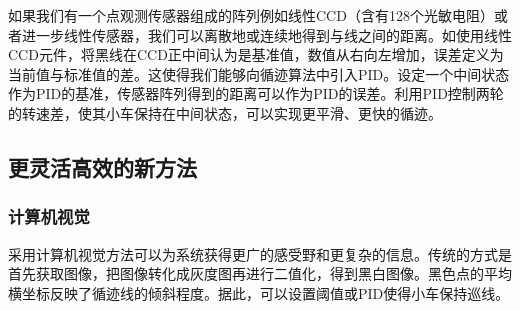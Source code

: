 \documentclass{paper}
\begin{document}
如果我们有一个点观测传感器组成的阵列例如线性CCD（含有128个光敏电阻）或者进一步线性传感器，我们可以离散地或连续地得到与线之间的距离。如使用线性CCD元件\cite{CCD}，将黑线在CCD正中间认为是基准值，数值从右向左增加，误差定义为当前值与标准值的差。这使得我们能够向循迹算法中引入PID。设定一个中间状态作为PID的基准，传感器阵列得到的距离可以作为PID的误差。利用PID控制两轮的转速差，使其小车保持在中间状态，可以实现更平滑、更快的循迹。

\subsection{更灵活高效的新方法}
\label{subsec:label}
\subsubsection{计算机视觉\cite{opencv}}
\label{subsec:label}
采用计算机视觉方法可以为系统获得更广的感受野和更复杂的信息。传统的方式是首先获取图像，把图像转化成灰度图再进行二值化，得到黑白图像。黑色点的平均横坐标反映了循迹线的倾斜程度。据此，可以设置阈值或PID使得小车保持巡线。
\end{document}
